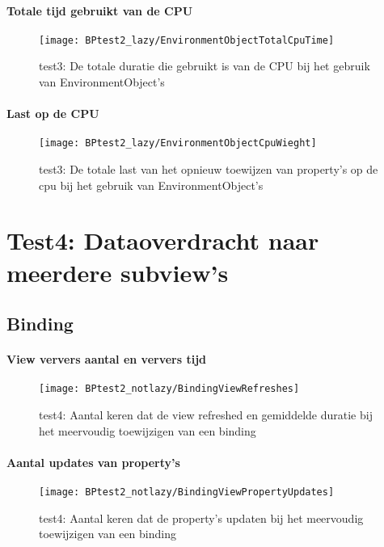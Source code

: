 \paragraph{Totale tijd gebruikt van de CPU}
\begin{figure}[H]
    \centering
    \texttt{[image: BPtest2\_lazy/EnvironmentObjectTotalCpuTime]} 
    \caption{test3: De totale duratie die gebruikt is van de CPU bij het gebruik van EnvironmentObject's}
    \label{fig:cpuUsageTimeEnvironmentObject2}
\end{figure}
\paragraph{Last op de CPU}
\begin{figure}[H]
    \centering
    \texttt{[image: BPtest2\_lazy/EnvironmentObjectCpuWieght]} 
    \caption{test3: De totale last van het opnieuw toewijzen van property's op de cpu bij het gebruik van EnvironmentObject's}
    \label{fig:cpuWeightEnvironmentObject2}
\end{figure}

\section{Test4: Dataoverdracht naar meerdere subview's}
\subsection{Binding}
\paragraph{View ververs aantal en ververs tijd}
\begin{figure}[H]
    \centering
    \texttt{[image: BPtest2\_notlazy/BindingViewRefreshes]} 
    \caption{test4: Aantal keren dat de view refreshed en gemiddelde duratie bij het meervoudig toewijzigen van een binding}
    \label{fig:viewRefreshesBinding3}
\end{figure}
\paragraph{Aantal updates van property's}
\begin{figure}[H]
    \centering
    \texttt{[image: BPtest2\_notlazy/BindingViewPropertyUpdates]} 
    \caption{test4: Aantal keren dat de property's updaten bij het meervoudig toewijzigen van een binding}
    \label{fig:propertyUpdatesBinding3}
\end{figure}
